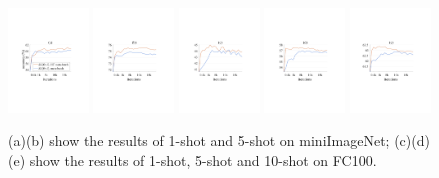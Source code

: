 \begin{figure}
\includegraphics[height=1.09in]{mini1shot.pdf}
\includegraphics[height=1.09in]{mini5shot.pdf}
\includegraphics[height=1.09in]{fc1shot.pdf}
\includegraphics[height=1.09in]{fc5shot.pdf}
\includegraphics[height=1.09in]{fc10shot.pdf}
\caption{(a)(b) show the results of 1-shot and 5-shot on miniImageNet; (c)(d)(e) show the results of 1-shot, 5-shot and 10-shot on FC100.}
\vspace{-0.3cm}
\label{fig_mini_fc100}
\end{figure}